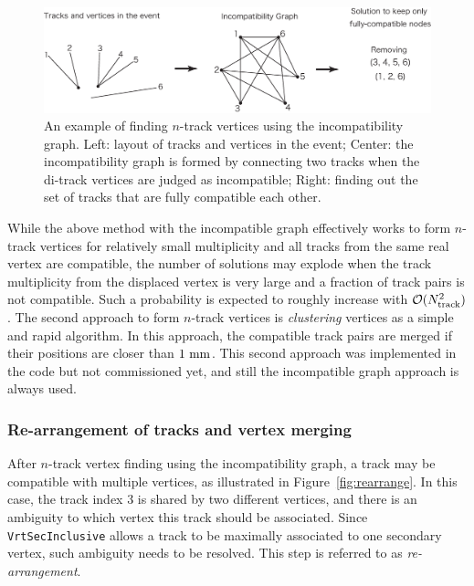 \begin{figure}[t]
\begin{center}
\includegraphics[width=1.0\textwidth]{figures/incomp}
\caption{An example of finding $n$-track vertices using the incompatibility graph. Left: layout of tracks and vertices in the event; Center: the incompatibility graph is formed by connecting two tracks when the di-track vertices are judged as incompatible; Right: finding out the set of tracks that are fully compatible each other.}
\label{fig:incomp}
\end{center}
\end{figure}


While the above method with the incompatible graph effectively works to form $n$-track vertices for relatively small multiplicity and all tracks from the same real vertex are compatible, the number of solutions may explode when the track multiplicity from the displaced vertex is very large and a fraction of track pairs is not compatible. Such a probability is expected to roughly increase with ${\cal O}(N_{\rm track}^{2})$. The second approach to form $n$-track vertices is {\it clustering} vertices as a simple and rapid algorithm. In this approach, the compatible track pairs are merged if their positions are closer than $1~{\rm mm}$. This second approach was implemented in the code but not commissioned yet, and still the incompatible graph approach is always used.

\subsubsection{Re-arrangement of tracks and vertex merging}
After $n$-track vertex finding using the incompatibility graph, a track may be compatible with multiple vertices, as illustrated in Figure~\ref{fig:rearrange}. In this case, the track index 3 is shared by two different vertices, and there is an ambiguity to which vertex this track should be associated. Since {\tt VrtSecInclusive} allows a track to be maximally associated to one secondary vertex, such ambiguity needs to be resolved. This step is referred to as \emph{re-arrangement}.

